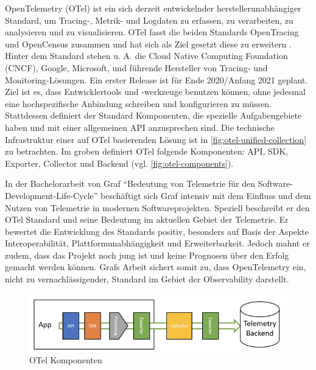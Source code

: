 OpenTelemetry (OTel) \cite{OpenTelemetry} ist ein sich derzeit entwickelnder herstellerunabhängiger Standard, um Tracing-, Metrik- und Logdaten\footnotemark{} zu erfassen, zu verarbeiten, zu analysieren und zu visualisieren. OTel fasst die beiden Standards OpenTracing und OpenCensus \cite{OpenCensus} zusammen und hat sich als Ziel gesetzt diese zu erweitern \cite{UseNixDistributiveTracing}. Hinter dem Standard stehen u. A. die Cloud Native Computing Foundation (CNCF), Google, Microsoft, und führende Hersteller von Tracing- und Monitoring-Lösungen. Ein erster Release ist für Ende 2020/Anfang 2021 geplant. Ziel ist es, dass Entwicklertools und -werkzeuge benutzen können, ohne jedesmal eine hochspezifische Anbindung schreiben und konfigurieren zu müssen. Stattdessen definiert der Standard Komponenten, die spezielle Aufgabengebiete haben und mit einer allgemeinen API anzusprechen sind. Die technische Infrastruktur einer auf OTel basierenden Lösung ist in \autoref{fig:otel-unified-collection} zu betrachten. Im groben definiert OTel folgende Komponenten: API, SDK, Exporter, Collector und Backend (vgl. \autoref{fig:otel-components}).

In der Bachelorarbeit von Graf \enquote{Bedeutung von Telemetrie für den Software-Development-Life-Cycle} \cite{MichaelGrafBA} beschäftigt sich Graf intensiv mit dem Einfluss und dem Nutzen von Telemetrie in modernen Softwareprojekten. Speziell beschreibt er den OTel Standard und seine Bedeutung im aktuellen Gebiet der Telemetrie. Er bewertet die Entwicklung des Standards positiv, besonders auf Basis der Aspekte Interoperabilität, Plattformunabhängigkeit und Erweiterbarkeit. Jedoch mahnt er zudem, dass das Projekt noch jung ist und keine Prognosen über den Erfolg gemacht werden können. Grafs Arbeit sichert somit zu, dass OpenTelemetry ein, nicht zu vernachlässigender, Standard im Gebiet der Observability darstellt.


\begin{figure}[H]
	\centering
	\includegraphics[width=0.55\linewidth]{img/03_methoden/dynatrace_otel-components.png}
	\caption{OTel Komponenten \cite{DynatraceOTelComponents}}
	\label{fig:otel-components}
\end{figure}

